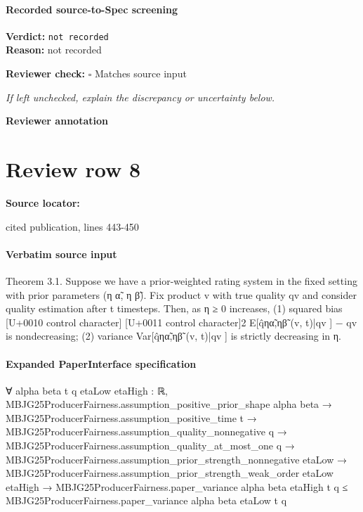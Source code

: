 \documentclass[10pt]{article}
\newcommand{\reviewerbox}{%
  \par\noindent\fbox{\parbox{0.96\linewidth}{\rule{0pt}{0.38in}}}\par
}
\newcommand{\reviewmatch}[1]{%
  \par\noindent\textbf{Reviewer check:} $\square$\; #1\par
  \noindent\emph{If left unchecked, explain the discrepancy or uncertainty below.}\par
}
\begin{document}
\paragraph{Recorded source-to-Spec screening}
\textbf{Verdict:} \texttt{not recorded}
\\
\textbf{Reason:} not recorded
\reviewmatch{Matches source input}
\noindent\textbf{Reviewer annotation}\par
\reviewerbox
\clearpage
\hypertarget{source-claim-000171f0bf87b98c}{}
\section*{Review row 8}
\textbf{Source locator:} {\footnotesize\raggedright cited publication, lines 443-\allowbreak{}450\par}
\paragraph{Verbatim source input}
\begin{ReviewVerbatim}
Theorem 3.1. Suppose we have a prior-weighted rating system in the fixed setting with prior parameters (η α̃, η β̃). Fix
product v with true quality qv and consider quality estimation after t timesteps.
Then, as η
≥ 0 increases, (1) squared bias
[U+0010 control character]
[U+0011 control character]2
E[q̂ηα̃,ηβ̃ (v, t)|qv ] − qv
is nondecreasing; (2) variance Var[q̂ηα̃,ηβ̃ (v, t)|qv ] is strictly decreasing in η.
\end{ReviewVerbatim}


\paragraph{Expanded PaperInterface specification}
\begin{ReviewVerbatim}
∀ {alpha beta t q etaLow etaHigh : ℝ},
  MBJG25ProducerFairness.assumption_positive_prior_shape alpha beta →
    MBJG25ProducerFairness.assumption_positive_time t →
      MBJG25ProducerFairness.assumption_quality_nonnegative q →
        MBJG25ProducerFairness.assumption_quality_at_most_one q →
          MBJG25ProducerFairness.assumption_prior_strength_nonnegative etaLow →
            MBJG25ProducerFairness.assumption_prior_strength_weak_order etaLow etaHigh →
              MBJG25ProducerFairness.paper_variance alpha beta etaHigh t q ≤
                MBJG25ProducerFairness.paper_variance alpha beta etaLow t q
\end{ReviewVerbatim}
\end{document}
